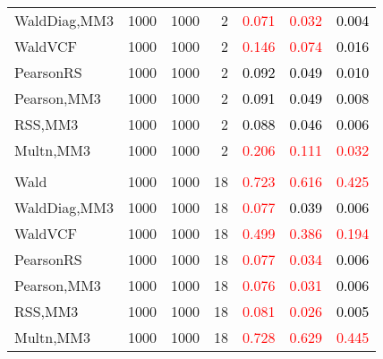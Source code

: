 \documentclass[
]{article}
\begin{document}
\begin{table}[H]
{\begin{tabular}[t]{lrrrrrr}
\hspace{1em}WaldDiag,MM3 & 1000 & 1000 & 2 & \textcolor{red}{0.071} & \textcolor{red}{0.032} & \textcolor{black}{0.004}\\
\hspace{1em}WaldVCF & 1000 & 1000 & 2 & \textcolor{red}{0.146} & \textcolor{red}{0.074} & \textcolor{black}{0.016}\\
\hspace{1em}PearsonRS & 1000 & 1000 & 2 & \textcolor{black}{0.092} & \textcolor{black}{0.049} & \textcolor{black}{0.010}\\
\hspace{1em}Pearson,MM3 & 1000 & 1000 & 2 & \textcolor{black}{0.091} & \textcolor{black}{0.049} & \textcolor{black}{0.008}\\
\hspace{1em}RSS,MM3 & 1000 & 1000 & 2 & \textcolor{black}{0.088} & \textcolor{black}{0.046} & \textcolor{black}{0.006}\\
\hspace{1em}Multn,MM3 & 1000 & 1000 & 2 & \textcolor{red}{0.206} & \textcolor{red}{0.111} & \textcolor{red}{0.032}\\
\addlinespace[0.3em]
\multicolumn{7}{l}{\textbf{1F 15V}}\\
\hspace{1em}Wald & 1000 & 1000 & 18 & \textcolor{red}{0.723} & \textcolor{red}{0.616} & \textcolor{red}{0.425}\\
\hspace{1em}WaldDiag,MM3 & 1000 & 1000 & 18 & \textcolor{red}{0.077} & \textcolor{black}{0.039} & \textcolor{black}{0.006}\\
\hspace{1em}WaldVCF & 1000 & 1000 & 18 & \textcolor{red}{0.499} & \textcolor{red}{0.386} & \textcolor{red}{0.194}\\
\hspace{1em}PearsonRS & 1000 & 1000 & 18 & \textcolor{red}{0.077} & \textcolor{red}{0.034} & \textcolor{black}{0.006}\\
\hspace{1em}Pearson,MM3 & 1000 & 1000 & 18 & \textcolor{red}{0.076} & \textcolor{red}{0.031} & \textcolor{black}{0.006}\\
\hspace{1em}RSS,MM3 & 1000 & 1000 & 18 & \textcolor{red}{0.081} & \textcolor{red}{0.026} & \textcolor{black}{0.005}\\
\hspace{1em}Multn,MM3 & 1000 & 1000 & 18 & \textcolor{red}{0.728} & \textcolor{red}{0.629} & \textcolor{red}{0.445}\\

\end{tabular}}
\end{table}
\end{document}
